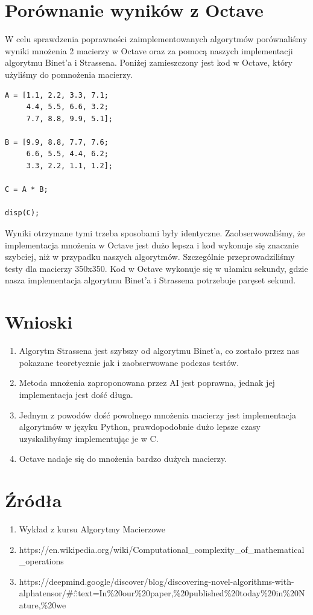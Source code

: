 \documentclass{article}
\begin{document}
\section{Porównanie wyników z Octave}

W celu sprawdzenia poprawności zaimplementowanych algorytmów porównaliśmy wyniki mnożenia 2 macierzy w Octave oraz za pomocą naszych implementacji algorytmu Binet'a i Strassena. Poniżej zamieszczony jest kod w Octave, który użyliśmy do pomnożenia macierzy.

\begin{verbatim}
A = [1.1, 2.2, 3.3, 7.1;
     4.4, 5.5, 6.6, 3.2;
     7.7, 8.8, 9.9, 5.1];

B = [9.9, 8.8, 7.7, 7.6;
     6.6, 5.5, 4.4, 6.2;
     3.3, 2.2, 1.1, 1.2];

C = A * B;

disp(C);
\end{verbatim}

\noindent
Wyniki otrzymane tymi trzeba sposobami były identyczne. Zaobserwowaliśmy, że implementacja mnożenia w Octave jest dużo lepsza i kod wykonuje się znacznie szybciej, niż w przypadku naszych algorytmów. Szczególnie przeprowadziliśmy testy dla macierzy 350x350. Kod w Octave wykonuje się w ułamku sekundy, gdzie nasza implementacja algorytmu Binet'a i Strassena potrzebuje paręset sekund.

\section{Wnioski}

\begin{enumerate}
    \item Algorytm Strassena jest szybszy od algorytmu Binet'a, co zostało przez nas pokazane teoretycznie jak i zaobserwowane podczas testów.
    \item Metoda mnożenia zaproponowana przez AI jest poprawna, jednak jej implementacja jest dość długa.
    \item Jednym z powodów dość powolnego mnożenia macierzy jest implementacja algorytmów w języku Python, prawdopodobnie dużo lepsze czasy uzyskalibyśmy implementując je w C.
    \item Octave nadaje się do mnożenia bardzo dużych macierzy.
\end{enumerate}

\section{Źródła}

\begin{enumerate}
    \item Wykład z kursu Algorytmy Macierzowe
    \item https://en.wikipedia.org/wiki/Computational\_complexity\_of\_mathematical\_operations
    \item https://deepmind.google/discover/blog/discovering-novel-algorithms-with-alphatensor/\#:\~:text=In\%20our\%20paper,\%20published\%20today\%20in\%20Nature,\%20we
\end{enumerate}
\end{document}
